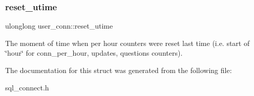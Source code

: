 \subsubsection{\texorpdfstring{reset\+\_\+utime}{reset\_utime}}
{\footnotesize\ttfamily ulonglong user\+\_\+conn\+::reset\+\_\+utime}

The moment of time when per hour counters were reset last time (i.\+e. start of \char`\"{}hour\char`\"{} for conn\+\_\+per\+\_\+hour, updates, questions counters). 

The documentation for this struct was generated from the following file\+:\begin{DoxyCompactItemize}
\item 
sql\+\_\+connect.\+h\end{DoxyCompactItemize}
